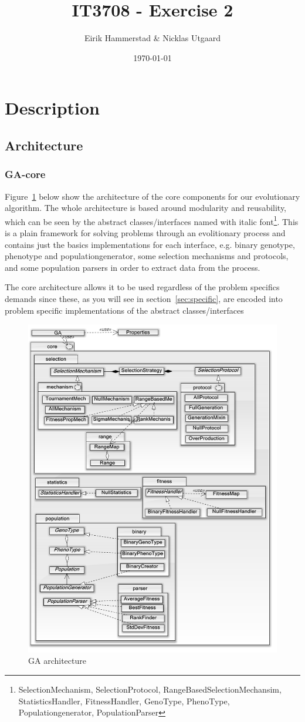 \documentclass[12pt]{article}
\title{IT3708 - Exercise 2}
\author{
        Eirik Hammerstad \& Nicklas Utgaard
}
\date{\today}
\begin{document}
\maketitle
\pagebreak
\tableofcontents
\pagebreak
\section{Description}
	\subsection{Architecture}
		\subsubsection{GA-core}\label{sec:core}
			Figure~\ref{fig:gastruct} below show the architecture of the core components for our evolutionary algorithm. The whole architecture is based around modularity and reusability, which can be seen by the abstract classes/interfaces named with italic font\footnote{\label{foot:abstractinterface}SelectionMechanism, SelectionProtocol, RangeBasedSelectionMechansim, StatisticsHandler, FitnessHandler, GenoType, PhenoType, Populationgenerator, PopulationParser}. This is a plain framework for solving problems through an evolitionary process and contains just the basics implementations for each interface, e.g. binary genotype, phenotype and populationgenerator, some selection mechanisms and protocols, and some population parsers in order to extract data from the process.
			
			The core architecture allows it to be used regardless of the problem specifics demands since these, as you will see in section~\ref{sec:specific}, are encoded into problem specific implementations of the abstract classes/interfaces\footnotemark[\ref{foot:abstractinterface}]
			\begin{figure}[H]
				\centerline{\includegraphics[width=.7\columnwidth]{./../images/GAStruct.png}}
				\caption{GA architecture}%
				\label{fig:gastruct}%
			\end{figure}
\end{document}
